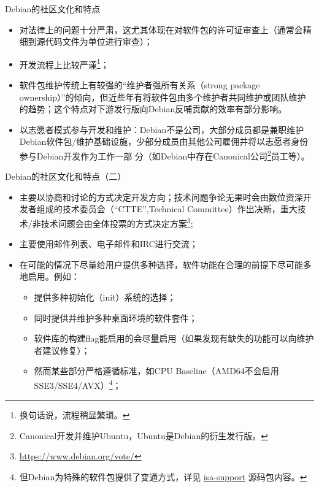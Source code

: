 \begin{frame}{Debian的社区文化和特点}
       \begin{itemize}
               \item 对法律上的问题十分严肃，这尤其体现在对软件包的许可证审查上（通常会精细到源代码文件为单位进行审查）；
               \item 开发流程上比较严谨\footnote{换句话说，流程稍显繁琐。}；
               \item 软件包维护传统上有较强的“维护者强所有关系（strong package ownership）”的倾向，但近些年有将软件包由多个维护者共同维护或团队维护的趋势；这个特点对下游发行版向Debian反哺贡献的效率有部分影响。
               \item 以志愿者模式参与开发和维护：Debian不是公司，大部分成员都是兼职维护Debian软件包/维护基础设施，少部分成员由其他公司雇佣并将以志愿者身份参与Debian开发作为工作一部
分（如Debian中存在Canonical公司\footnote{Canonical开发并维护Ubuntu，Ubuntu是Debian的衍生发行版。}员工等）。
       \end{itemize}
\end{frame}

\begin{frame}{Debian的社区文化和特点（二）}
       \begin{itemize}
               \item 主要以协商和讨论的方式决定开发方向；技术问题争论无果时会由数位资深开发者组成的技术委员会（“CTTE”,Technical Committee）作出决断，重大技术/非技术问题会由全体投票的方式决定方案\footnote{\url{https://www.debian.org/vote/}};
               \item 主要使用邮件列表、电子邮件和IRC进行交流；
               \item 在可能的情况下尽量给用户提供多种选择，软件功能在合理的前提下尽可能多地启用。例如：
               \begin{itemize}
                       \item 提供多种初始化（init）系统的选择；
                       \item 同时提供并维护多种桌面环境的软件套件；
                       \item 软件库的构建flag能启用的会尽量启用（如果发现有缺失的功能可以向维护者建议修复）；
                       \item 然而某些部分严格遵循标准，如CPU Baseline（AMD64不会启用SSE3/SSE4/AVX）\footnote{但Debian为特殊的软件包提供了变通方式，详见 \href{https://tracker.debian
.org/pkg/isa-support}{isa-support} 源码包内容。}；
               \end{itemize}
       \end{itemize}
\end{frame}